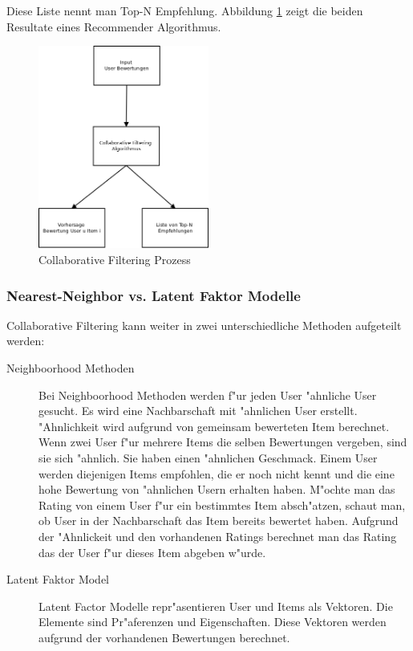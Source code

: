\documentclass[a4paper, 12pt]{article}
\begin{document}
Diese Liste nennt man Top-N Empfehlung. Abbildung \ref{fig:cfprocess} zeigt die beiden Resultate eines Recommender Algorithmus.

\begin{figure}
  \centering
      \includegraphics[width=0.5\textwidth]{cf}
  \caption{Collaborative Filtering Prozess}
  \label{fig:cfprocess}
\end{figure}

\subsubsection{Nearest-Neighbor vs. Latent Faktor Modelle}
\label{sec:cfmodels}

Collaborative Filtering kann weiter in zwei unterschiedliche Methoden aufgeteilt werden:

\begin{description}
\item[Neighboorhood Methoden] Bei Neighboorhood Methoden werden f"ur jeden User "ahnliche User gesucht. Es wird eine Nachbarschaft mit "ahnlichen User erstellt.
"Ahnlichkeit wird aufgrund von gemeinsam bewerteten Item berechnet. Wenn zwei User f"ur mehrere Items die selben Bewertungen vergeben, sind sie sich "ahnlich. Sie haben einen "ahnlichen Geschmack. Einem User werden diejenigen Items empfohlen, die er noch nicht kennt und die eine hohe Bewertung von "ahnlichen Usern erhalten haben.
M"ochte man das Rating von einem User f"ur ein bestimmtes Item ab\-sch"atz\-en, schaut man, ob User in der Nachbarschaft das Item bereits bewertet haben. Aufgrund der "Ahnlickeit und den vorhandenen Ratings berechnet man das Rating das der User f"ur dieses Item abgeben w"urde.
\item[Latent Faktor Model] Latent Factor Modelle repr"asentieren User und Items als Vektoren. Die Elemente sind Pr"aferenzen und Eigenschaften. Diese Vektoren werden aufgrund der vorhandenen Bewertungen berechnet.
\end{description}
\end{document}

